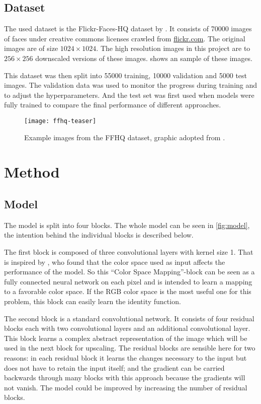 \documentclass{scrartcl}
\begin{document}
\subsection{Dataset}

The used dataset is the Flickr-Faces-HQ dataset by \textcite{style_gan}.
It consists of \num{70000} images of faces under creative commons licenses crawled from \href{https://www.flickr.com}{flickr.com}.
The original images are of size \( \num{1024} \times \num{1024} \).
The high resolution images in this project are to \( \num{256} \times \num{256} \) downscaled versions of these images.
 shows an sample of these images.

This dataset was then split into \num{55000} training, \num{10000} validation and \num{5000} test images.
The validation data was used to monitor the progress during training and to adjust the hyperparameters.
And the test set was first used when models were fully trained to compare the final performance of different approaches.

\begin{figure}
	\centering
	\texttt{[image: ffhq-teaser]}
	\caption{Example images from the FFHQ dataset, graphic adopted from \textcite{style_gan}.}
	\label{fig:ffhq-teaser}
\end{figure} 

\section{Method}

\subsection{Model}
The model is split into four blocks. The whole model can be seen in \cref{fig:model}, the intention behind the individual blocks is described below.

The first block is composed of three convolutional layers with kernel size 1.
That is inspired by \textcite{color_net}, who found that the color space used as input affects the performance of the model.  
So this \enquote{Color Space Mapping}-block can be seen as a fully connected neural network on each pixel and is intended to learn a mapping to a favorable color space.
If the RGB color space is the most useful one for this problem, this block can easily learn the identity function.

The second block is a standard convolutional network.
It consists of four residual blocks each with two convolutional layers and an additional convolutional layer.
This block learns a complex abstract representation of the image which will be used in the next block for upscaling.
The residual blocks are sensible here for two reasons: in each residual block it learns the changes necessary to the input but does not have to retain the input itself; and the gradient can be carried backwards through many blocks with this approach because the gradients will not vanish.
The model could be improved by increasing the number of residual blocks.
\end{document}
